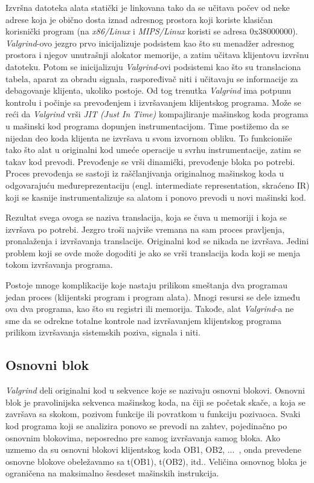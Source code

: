 \documentclass[12pt,oneside]{memoir}
\theoremstyle{plain}
\theoremstyle{definition}
\begin{document}
Izvršna datoteka alata statički je linkovana tako da se učitava počev od neke adrese koja je obično dosta iznad adresnog prostora koji koriste klasičan korisnički program (na \textit{x86/Linux} i \textit{MIPS/Linux} koristi se adresa 0x38000000). \textit{Valgrind}-ovo jezgro prvo inicijalizuje podsistem kao što su menadžer adresnog prostora i njegov unutrašnji alokator memorije, a zatim učitava klijentovu izvršnu datoteku. Potom se inicijalizuju \textit{Valgrind}-ovi podsistemi kao što su translaciona tabela, aparat za obradu signala, raspoređivač niti i učitavaju se informacije za debagovanje klijenta, ukoliko postoje. Od tog trenutka \textit{Valgrind} ima potpunu kontrolu i počinje sa prevođenjem i izvršavanjem klijentskog programa. Može se reći da \textit{Valgrind} vrši \textit{JIT (Just In Time)} kompajliranje mašinskog koda programa u mašinski kod programa dopunjen instrumentacijom. Time postižemo da se nijedan deo koda klijenta ne izvršava u svom izvornom obliku. To funkcioniše tako što alat u originalni kod umeće operacije u svrhu instrumentacije, zatim se takav kod prevodi. Prevođenje se vrši dinamički, prevođenje bloka po potrebi. Proces prevođenja se sastoji iz raščlanjivanja originalnog mašinskog koda u odgovarajuću međureprezentaciju (engl. intermediate representation, skraćeno IR) koji se kasnije instrumentalizuje sa alatom i ponovo prevodi u novi mašinski kod.

Rezultat svega ovoga se naziva translacija, koja se čuva u memoriji i koja se izvršava po potrebi. Jezgro troši najviše vremana na sam proces pravljenja,  pronalaženja i izvršavanja translacije. Originalni kod se nikada ne izvršava. Jedini problem koji se ovde može dogoditi je ako se vrši translacija koda koji se menja tokom izvršavanja programa.

Postoje mnoge komplikacije koje nastaju prilikom smeštanja dva programau jedan proces (klijentski program i program alata). Mnogi resursi se dele između ova dva programa, kao što su registri ili memorija. Takođe, alat \textit{Valgrind}-a ne sme da se odrekne totalne kontrole nad izvršavanjem klijentskog programa prilikom izvršavanja sistemskih poziva, signala i niti.

\subsection*{Osnovni blok}
\textit{Valgrind} deli originalni kod u sekvence koje se nazivaju osnovni blokovi. Osnovni blok je pravolinijska sekvenca mašinskog koda, na čiji se početak skače, a koja se završava sa skokom, pozivom funkcije ili povratkom u funkciju pozivaoca. Svaki kod programa koji se analizira ponovo se prevodi na zahtev, pojedinačno po osnovnim blokovima, neposredno pre samog izvršavanja samog bloka. Ako uzmemo da su osnovni blokovi klijentskog koda OB1, OB2, ...~, onda prevedene osnovne blokove obeležavamo sa t(OB1), t(OB2), itd.. Veličina osnovnog bloka je ograničena na maksimalno šesdeset mašinskih instrukcija.
\end{document}
